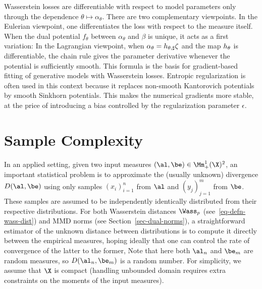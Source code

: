 Wasserstein losses are differentiable with respect to model parameters only through the dependence $\theta \mapsto \alpha_\theta$. There are two complementary viewpoints.
%
In the Eulerian viewpoint, one differentiates the loss with respect to the measure itself. When the dual potential $f_\theta$ between $\alpha_\theta$ and $\beta$ is unique, it acts as a first variation:
%
In the Lagrangian viewpoint, when $\alpha_\theta=h_{\theta,\sharp}\zeta$ and the map $h_\theta$ is differentiable, the chain rule gives the parameter derivative
whenever the potential is sufficiently smooth. This formula is the basis for gradient-based fitting of generative models with Wasserstein losses.
%
Entropic regularization is often used in this context because it replaces non-smooth Kantorovich potentials by smooth Sinkhorn potentials. This makes the numerical gradients more stable, at the price of introducing a bias controlled by the regularization parameter $\epsilon$.


\section{Sample Complexity}

In an applied setting, given two input measures $(\al,\be) \in \Mm_+^1(\X)^2$, an important statistical problem is to approximate the (usually unknown) divergence $D(\al,\be)$ using only samples $(x_i)_{i=1}^n$ from $\al$ and $(y_j)_{j=1}^m$ from $\be$. These samples are assumed to be independently identically distributed from their respective distributions.
%
For both Wasserstein distances $\Wass_p$ (see~\ref{eq-defn-wass-dist}) and MMD norms (see Section~\ref{sec-dual-norms}), a straightforward estimator of the unknown distance between distributions is to compute it directly between the empirical measures, hoping ideally that one can control the rate of convergence of the latter to the former,
Note that here both $\al_n$ and $\be_m$ are random measures, so $D(\al_n,\be_m)$ is a random number.
%
For simplicity, we assume that $\X$ is compact (handling unbounded domain requires extra constraints on the moments of the input measures).


